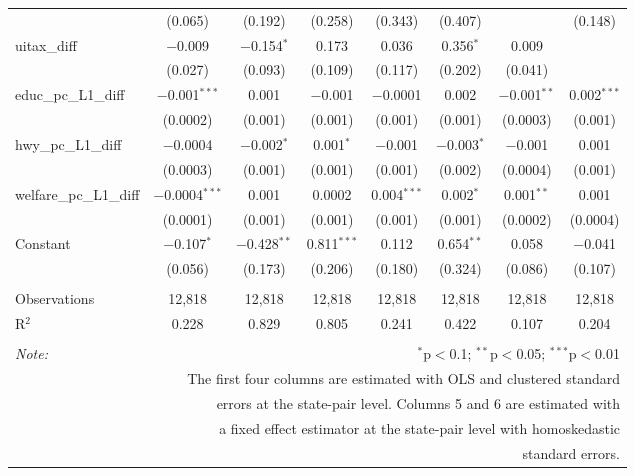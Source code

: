 \begin{table}[!htbp]
\begin{tabular}{@{\extracolsep{5pt}}lccccccc}
  & (0.065) & (0.192) & (0.258) & (0.343) & (0.407) &  & (0.148) \\ 
  uitax\_diff & $-$0.009 & $-$0.154$^{*}$ & 0.173 & 0.036 & 0.356$^{*}$ & 0.009 &  \\ 
  & (0.027) & (0.093) & (0.109) & (0.117) & (0.202) & (0.041) &  \\ 
  educ\_pc\_L1\_diff & $-$0.001$^{***}$ & 0.001 & $-$0.001 & $-$0.0001 & 0.002 & $-$0.001$^{**}$ & 0.002$^{***}$ \\ 
  & (0.0002) & (0.001) & (0.001) & (0.001) & (0.001) & (0.0003) & (0.001) \\ 
  hwy\_pc\_L1\_diff & $-$0.0004 & $-$0.002$^{*}$ & 0.001$^{*}$ & $-$0.001 & $-$0.003$^{*}$ & $-$0.001 & 0.001 \\ 
  & (0.0003) & (0.001) & (0.001) & (0.001) & (0.002) & (0.0004) & (0.001) \\ 
  welfare\_pc\_L1\_diff & $-$0.0004$^{***}$ & 0.001 & 0.0002 & 0.004$^{***}$ & 0.002$^{*}$ & 0.001$^{**}$ & 0.001 \\ 
  & (0.0001) & (0.001) & (0.001) & (0.001) & (0.001) & (0.0002) & (0.0004) \\ 
  Constant & $-$0.107$^{*}$ & $-$0.428$^{**}$ & 0.811$^{***}$ & 0.112 & 0.654$^{**}$ & 0.058 & $-$0.041 \\ 
  & (0.056) & (0.173) & (0.206) & (0.180) & (0.324) & (0.086) & (0.107) \\ 
 \hline \\[-1.8ex] 
Observations & 12,818 & 12,818 & 12,818 & 12,818 & 12,818 & 12,818 & 12,818 \\ 
R$^{2}$ & 0.228 & 0.829 & 0.805 & 0.241 & 0.422 & 0.107 & 0.204 \\ 
\hline 
\hline \\[-1.8ex] 
\textit{Note:}  & \multicolumn{7}{r}{$^{*}$p$<$0.1; $^{**}$p$<$0.05; $^{***}$p$<$0.01} \\ 
 & \multicolumn{7}{r}{The first four columns are estimated with OLS and clustered standard} \\ 
 & \multicolumn{7}{r}{ errors at the state-pair level. Columns 5 and 6 are estimated with} \\ 
 & \multicolumn{7}{r}{a fixed effect estimator at the state-pair level with homoskedastic} \\ 
 & \multicolumn{7}{r}{standard errors.} \\ 
\end{tabular} 
\end{table} 
